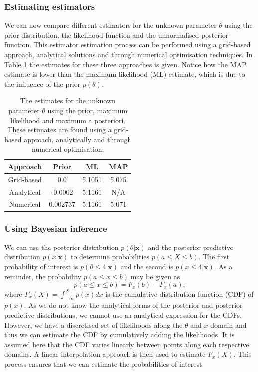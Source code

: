 \documentclass{article}
\begin{document}
\subsubsection{Estimating estimators}
We can now compare different estimators for the unknown parameter $\theta$ using the prior distribution, the likelihood function and the unnormalised posterior function. This estimator estimation process can be performed using a grid-based approach, analytical solutions and through numerical optimisation techniques. In Table \ref{tab:Q1_a} the estimates for these three approaches is given. Notice how the MAP estimate is lower than the maximum likelihood (ML) estimate, which is due to the influence of the prior $p(\theta)$.
\begin{table}[htb!]
\centering
\caption{The estimates for the unknown parameter $\theta$ using the prior, maximum likelihood and maximum a posteriori. These estimates are found using a grid-based approach, analytically and through numerical optimisation.}
\label{tab:Q1_a}
\begin{tabular}{@{}cccc@{}}
\toprule
Approach & Prior & ML & MAP \\ \midrule
Grid-based & 0.0 & 5.1051 & 5.075 \\
Analytical & -0.0002 & 5.1161 & N/A \\
Numerical & 0.002737 & 5.1161 & 5.071 \\ \bottomrule
\end{tabular}
\end{table}

\subsubsection{Using Bayesian inference}
We can use the posterior distribution $p(\theta \vert \mathbf{x})$ and the posterior predictive distribution $p(x \vert \mathbf{x})$ to determine probabilities $p(a \leq X \leq b)$. The first probability of interest is $p(\theta \leq 4 \vert \mathbf{x})$ and the second is $p(x \leq 4 \vert \mathbf{x})$. As a reminder, the probability $p(a \leq x \leq b)$ may be given as
\begin{equation}
p(a \leq x \leq b) = F_x(b) - F_x(a),
\end{equation}
where $F_x(X) = \int_{-\infty}^{X} p(x) dx$ is the cumulative distribution function (CDF) of $p(x)$. As we do not know the analytical forms of the posterior and posterior predictive distributions, we cannot use an analytical expression for the CDFs. However, we have a discretised set of likelihoods along the $\theta$ and $x$ domain and thus we can estimate the CDF by cumulatively adding the likelihoods. It is assumed here that the CDF varies linearly between points along each respective domains. A linear interpolation approach is then used to estimate $F_x(X)$. This process ensures that we can estimate the probabilities of interest.
\end{document}
